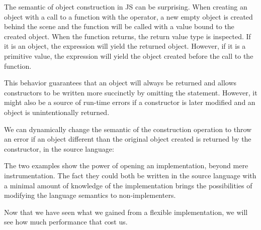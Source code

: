 The semantic of object construction in JS can be surprising. When creating an
object with a call to a function with the  operator, a new empty object
is created behind the scene and the function will be called with a 
value bound to the created object. When the function returns, the return value type 
is inspected. If it is an object, the  expression will yield the
returned object. However, if it is a primitive value, the  expression
will yield the object created before the call to the function.

This behavior guarantees that an object will always be returned and allows
constructors to be written more succinctly by omitting the 
statement. However, it might also be a source of run-time errors if a
constructor is later modified and an object is unintentionally returned.

We can dynamically change the semantic of the construction operation to throw
an error if an object different than the original object created is returned by
the constructor, in the source language:


The two examples show the power of opening an implementation, beyond mere
instrumentation. The fact they could both be written in the source language
with a minimal amount of knowledge of the implementation brings the
possibilities of modifying the language semantics to non-implementers.

Now that we have seen what we gained from a flexible implementation, we will
see how much performance that cost us.
